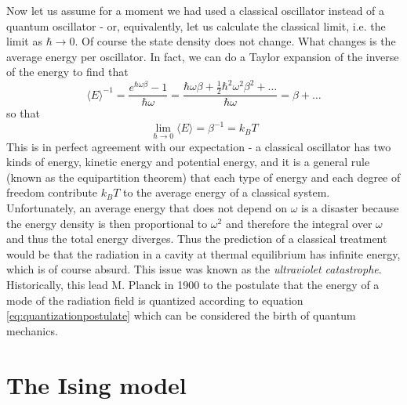 \documentclass[a4paper, draft]{article}
\theoremstyle{own}
\theoremstyle{remark}
\begin{document}
Now let us assume for a moment we had used a classical oscillator instead of a quantum oscillator - or, equivalently, let us calculate the classical limit, i.e. the limit as 
$\hbar \rightarrow 0$. Of course the state density does not change. What changes is the average energy per oscillator. In fact, we can do a Taylor expansion of the inverse of the energy to find that
$$
{\langle E \rangle}^{-1} = \frac{e^{\hbar \omega \beta} - 1}{\hbar \omega}
= \frac{\hbar \omega \beta + \frac{1}{2} \hbar^2 \omega^2 \beta^2 + \dots }{\hbar \omega}
= \beta + \dots
$$
so that
$$
\lim_{\hbar \rightarrow 0} \langle E \rangle = \beta^{-1} = k_B T
$$
This is in perfect agreement with our expectation - a classical oscillator has two kinds of energy, kinetic energy and potential energy, and it is a general rule (known as the equipartition theorem) that each type of energy and each degree of freedom contribute $k_B T$ to the average energy of a classical system. Unfortunately, an average energy that does not depend on $\omega$ is a disaster because the energy density is then proportional to $\omega^2$ and therefore the integral over $\omega$ and thus the total energy diverges. Thus the prediction of a classical treatment would be that the radiation in a cavity at thermal equilibrium has infinite energy, which is of course absurd. This issue was known as the {\em ultraviolet catastrophe}. Historically, this lead M. Planck in 1900 to the postulate that the energy of a mode of the radiation field is quantized according to equation \eqref{eq:quantizationpostulate} which can be considered the birth of quantum mechanics. 

\section{The Ising model}
\end{document}
